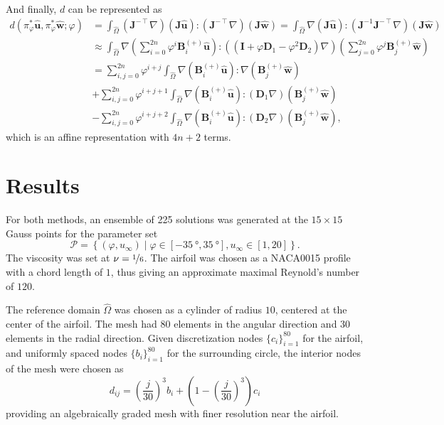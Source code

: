 \documentclass[onecolumn, twoside, a4paper, 11pt]{article}
\begin{document}
And finally, $d$ can be represented as
\begin{align}
  \nonumber
  d(
    \pi_{\varphi}^* \hat{\bm u},
    \pi_{\varphi}^* \hat{\bm w};
    \varphi
  ) &= \int_{\hat{\Omega}}
      (\bm J^{-\intercal} \nabla) (\bm J \hat{\bm u}) :
      (\bm J^{-\intercal} \nabla) (\bm J \hat{\bm w})
    = \int_{\hat{\Omega}}
      \nabla (\bm J \hat{\bm u}) :
      (\bm J^{-1} \bm J^{-\intercal} \nabla) (\bm J \hat{\bm w}) \\
  \nonumber
    &\approx \int_{\hat{\Omega}}
      \nabla \left( \sum_{i=0}^{2n} \varphi^i \bm B^{(+)}_i \hat{\bm u} \right) :
      ((\bm I + \varphi \bm D_1 - \varphi^2 \bm D_2) \nabla)
      \left( \sum_{j=0}^{2n} \varphi^j \bm B^{(+)}_j \hat{\bm w} \right) \\
  \nonumber
    &= \sum_{i,j=0}^{2n} \varphi^{i+j} \int_{\hat{\Omega}}
      \nabla (\bm B^{(+)}_i \hat{\bm u}) : \nabla (\bm B^{(+)}_j \hat{\bm w}) \\
  \nonumber
    &+ \sum_{i,j=0}^{2n} \varphi^{i+j+1} \int_{\hat{\Omega}}
      \nabla (\bm B^{(+)}_i \hat{\bm u}) : (\bm D_1 \nabla) (\bm B^{(+)}_j \hat{\bm w}) \\
    &- \sum_{i,j=0}^{2n} \varphi^{i+j+2} \int_{\hat{\Omega}}
      \nabla (\bm B^{(+)}_i \hat{\bm u}) : (\bm D_2 \nabla) (\bm B^{(+)}_j \hat{\bm w}),
\end{align}
which is an affine representation with $4n+2$ terms.

\section{Results}
\label{sec:results}

For both methods, an ensemble of 225 solutions was generated at the
$15 \times 15$ Gauss points for the parameter set
\[
  \mathcal{P} = \left\{ (\varphi,u_\infty) \;|\;
    \varphi \in [-\SI{35}{\degree},\SI{35}{\degree}],
    u_\infty \in [1, 20]
  \right\}.
\]
The viscosity was set at $\nu = \nicefrac{1}{6}$. The airfoil was chosen as a
NACA0015 profile with a chord length of $1$, thus giving an approximate maximal
Reynold's number of $120$.

The reference domain $\hat{\Omega}$ was chosen as a cylinder of radius $10$,
centered at the center of the airfoil. The mesh had $80$ elements in
the angular direction and $30$ elements in the radial direction. Given
discretization nodes $\{c_i\}_{i=1}^{80}$ for the airfoil, and
uniformly spaced nodes $\{b_i\}_{i=1}^{80}$ for the surrounding
circle, the interior nodes of the mesh were chosen as
\begin{equation}
  \label{eq:meshgen}
  d_{ij} = \left( \frac{j}{30} \right)^3 b_i +
  \left( 1 - \left( \frac{j}{30} \right)^3 \right) c_i
\end{equation}
providing an algebraically graded mesh with finer resolution near the airfoil.
\end{document}
